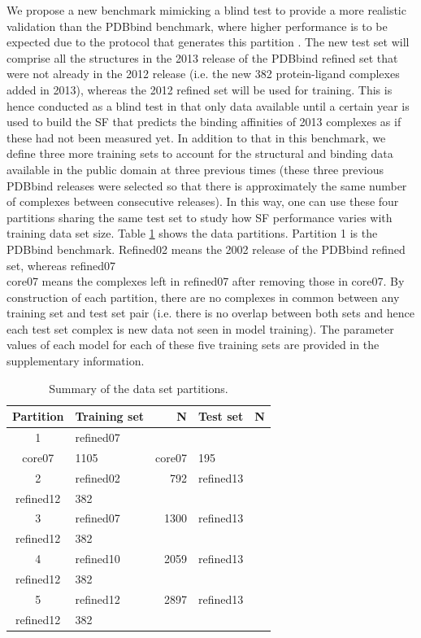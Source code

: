 We propose a new benchmark mimicking a blind test to provide a more realistic validation than the PDBbind benchmark, where higher performance is to be expected due to the protocol that generates this partition \citep{908}. The new test set will comprise all the structures in the 2013 release of the PDBbind refined set that were not already in the 2012 release (i.e. the new 382 protein-ligand complexes added in 2013), whereas the 2012 refined set will be used for training. This is hence conducted as a blind test in that only data available until a certain year is used to build the SF that predicts the binding affinities of 2013 complexes as if these had not been measured yet. In addition to that in this benchmark, we define three more training sets to account for the structural and binding data available in the public domain at three previous times (these three previous PDBbind releases were selected so that there is approximately the same number of complexes between consecutive releases). In this way, one can use these four partitions sharing the same test set to study how SF performance varies with training data set size. Table \ref{rfscore3:partitions} shows the data partitions. Partition 1 is the PDBbind benchmark. Refined02 means the 2002 release of the PDBbind refined set, whereas refined07\\core07 means the complexes left in refined07 after removing those in core07. By construction of each partition, there are no complexes in common between any training set and test set pair (i.e. there is no overlap between both sets and hence each test set complex is new data not seen in model training). The parameter values of each model for each of these five training sets are provided in the supplementary information.

\begin{table}
\caption{Summary of the data set partitions.}
\label{rfscore3:partitions}
\begin{tabular}{clrlr}
\hline
Partition & Training set & N & Test set & N\\
\hline
1 & refined07\\core07 & 1105 & core07               & 195\\
2 & refined02         &  792 & refined13\\refined12 & 382\\
3 & refined07         & 1300 & refined13\\refined12 & 382\\
4 & refined10         & 2059 & refined13\\refined12 & 382\\
5 & refined12         & 2897 & refined13\\refined12 & 382\\
\hline
\end{tabular}
\end{table}

